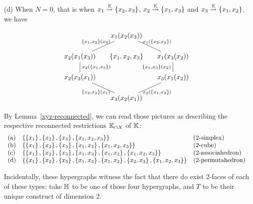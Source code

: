\smallskip\noindent
(d) When $N=0$, that is when $x_1\stackrel{{\mathbb K}}{\rightsquigarrow}\left\{x_2,x_3\right\}$, $x_2\stackrel{{\mathbb K}}{\rightsquigarrow}\left\{x_1,x_3\right\}$ and
 $x_3\stackrel{{\mathbb K}}{\rightsquigarrow}\left\{x_1,x_2\right\}$, we have
 
 $$\xymatrix @-1.65pc {&& x_1(x_2(x_3)) \ar @{-}[ddll]_{\set{x_1,x_2}(x_3)} \ar @{-}[ddrr]^{x_1(\set{x_2,x_3})}&& \\
 &&&&\\
 x_2(x_1(x_3)) \ar @{-}[dd]^{x_2(\set{x_1,x_3})}&& \set{x_1,x_2,x_3} && x_1(x_3(x_2))\ar @{-}[dd]_{\set{x_1,x_3}(x_2)}\\
 &&  &&\\
 x_2(x_3(x_1)) \ar @{-}[ddrr]_{\set{x_2,x_3}(x_1)} &&  && \ar @{-}[ddll]^{x_3(\set{x_1,x_2})} x_3(x_1(x_2))\\
 &&&&\\
 &&  x_3(x_2(x_1))&&}
$$

By Lemma~\ref{xyz-reconnected}, we can read those pictures as describing the 
respective reconnected restrictions ${\mathbb K}_{\cap X}$ of ${\mathbb K}$:
$$\begin{array}{lll}
\mathrm{(a)} & \left\{\left\{x_1\right\},\left\{x_2\right\},\left\{x_3\right\},\left\{x_1,x_2,x_3\right\}\right\} & \mbox{(2-simplex)}\\
\mathrm{(b)} & \left\{\left\{x_1\right\},\left\{x_2\right\},\left\{x_3\right\},\left\{x_1,x_3\right\},\left\{x_1,x_2,x_3\right\}\right\} & \mbox{(2-cube})\\
\mathrm{(c)} & \left\{\left\{x_1\right\},\left\{x_2\right\},\left\{x_3\right\},\left\{x_1,x_3\right\},\left\{x_1,x_2\right\},\left\{x_1,x_2,x_3\right\}\right\} & \mbox{(2-associahedron)}\\
\mathrm{(d)} & \left\{\left\{x_1\right\},\left\{x_2\right\},\left\{x_3\right\},\left\{x_1,x_3\right\},\left\{x_1,x_2\right\},\left\{x_2,x_3\right\},\left\{x_1,x_2,x_3\right\}\right\} & \mbox{(2-permutahedron)}
\end{array}$$

\begin{rem}
    Incidentally, these  hypergraphs witness the fact that there do exist 2-faces of  each  of these types: take ${\mathbb H}$ to be one of those four hypergraphs, and $T$ to be their unique construct of dimension 2.
\end{rem}







